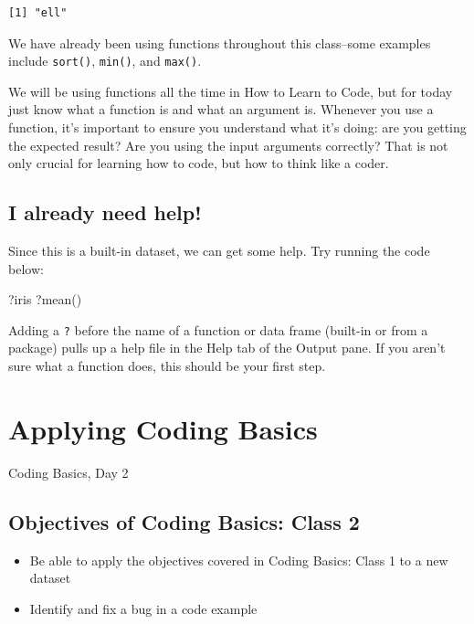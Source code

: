 \documentclass[
  letterpaper,
  DIV=11,
  numbers=noendperiod]{scrreprt}
\newenvironment{Shaded}{\begin{snugshade}}{\end{snugshade}}
\newcommand{\FunctionTok}[1]{\textcolor[rgb]{0.28,0.35,0.67}{#1}}
\newcommand{\NormalTok}[1]{\textcolor[rgb]{0.00,0.23,0.31}{#1}}
\begin{document}
\begin{verbatim}
[1] "ell"
\end{verbatim}

We have already been using functions throughout this class--some
examples include \texttt{sort()}, \texttt{min()}, and \texttt{max()}.

We will be using functions all the time in How to Learn to Code, but for
today just know what a function is and what an argument is. Whenever you
use a function, it's important to ensure you understand what it's doing:
are you getting the expected result? Are you using the input arguments
correctly? That is not only crucial for learning how to code, but how to
think like a coder.

\section{I already need help!}\label{i-already-need-help}

Since this is a built-in dataset, we can get some help. Try running the
code below:

\begin{Shaded}
\begin{Highlighting}[]
\NormalTok{?iris}
\NormalTok{?}\FunctionTok{mean}\NormalTok{()}
\end{Highlighting}
\end{Shaded}

Adding a \texttt{?} before the name of a function or data frame
(built-in or from a package) pulls up a help file in the Help tab of the
Output pane. If you aren't sure what a function does, this should be
your first step.


\chapter{Applying Coding Basics}\label{applying-coding-basics}

Coding Basics, Day 2

\hfill\break

\section{Objectives of Coding Basics: Class
2}\label{objectives-of-coding-basics-class-2}

\begin{itemize}
\item
  Be able to apply the objectives covered in Coding Basics: Class 1 to a
  new dataset
\item
  Identify and fix a bug in a code example
\end{itemize}
\end{document}
